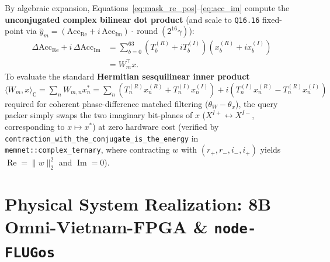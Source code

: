 \documentclass[10pt, twocolumn, a4paper]{article}
\begin{document}
By algebraic expansion, Equations~\eqref{eq:mask_re_pos}--\eqref{eq:acc_im} compute the \textbf{unconjugated complex bilinear dot product} (and scale to \texttt{Q16.16} fixed-point via $\hat{y}_m = (\text{Acc}_{\text{Re}} + i\,\text{Acc}_{\text{Im}}) \cdot \operatorname{round}(2^{16}\gamma)$):
\begin{equation}
\begin{split}
\Delta\text{Acc}_{\text{Re}} + i\,\Delta\text{Acc}_{\text{Im}} &= \sum_{b=0}^{63} \left(T_b^{(R)} + i T_b^{(I)}\right)\left(x_b^{(R)} + i x_b^{(I)}\right) \\
&= W_m^\top x.
\end{split}
\label{eq:bitplane_dot}
\end{equation}
To evaluate the standard \textbf{Hermitian sesquilinear inner product} $\langle W_m, x \rangle_{\mathbb{C}} = \sum_n W_{m,n} x_n^* = \sum_n (T_n^{(R)} x_n^{(R)} + T_n^{(I)} x_n^{(I)}) + i(T_n^{(I)} x_n^{(R)} - T_n^{(R)} x_n^{(I)})$ required for coherent phase-difference matched filtering ($\theta_W - \theta_x$), the query packer simply swaps the two imaginary bit-planes of $x$ ($X^{I+} \leftrightarrow X^{I-}$, corresponding to $x \mapsto x^*$) at zero hardware cost (verified by \texttt{contraction\_with\_the\_conjugate\_is\_the\_energy} in \texttt{memnet::complex\_ternary}, where contracting $w$ with $(r_+, r_-, i_-, i_+)$ yields $\operatorname{Re} = \|w\|_2^2$ and $\operatorname{Im} = 0$).

\section{Physical System Realization: 8B Omni-Vietnam-FPGA \& \texorpdfstring{\texttt{node-FLUGos}}{node-FLUGos}}
\end{document}
